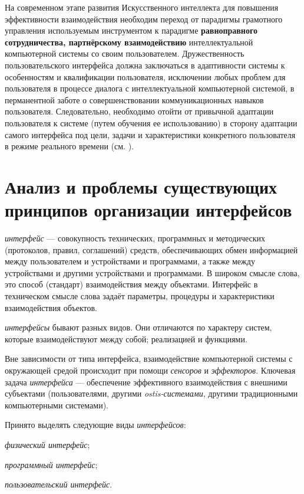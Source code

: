 На современном этапе развития Искусственного интеллекта для повышения эффективности взаимодействия необходим переход от парадигмы грамотного управления используемым инструментом к парадигме \textbf{равноправного сотрудничества, партнёрскому взаимодействию} интеллектуальной компьютерной системы со своим пользователем. Дружественность пользовательского интерфейса должна заключаться в адаптивности системы к особенностям и квалификации пользователя, исключении любых проблем для пользователя в процессе диалога с интеллектуальной компьютерной системой, в перманентной заботе о совершенствовании коммуникационных навыков пользователя. Следовательно, необходимо отойти от привычной адаптации пользователя к системе (путем обучения ее использованию) в сторону адаптации самого интерфейса под цели, задачи и характеристики конкретного пользователя в режиме реального времени (см. ).

\section{Анализ и проблемы существующих принципов организации интерфейсов}
\label{sec_analysis}

\textit{интерфейс} --- совокупность технических, программных и методических (протоколов, правил, соглашений) средств, обеспечивающих обмен информацией между пользователем и устройствами и программами, а также между устройствами и другими устройствами и программами. В широком смысле слова, это способ (стандарт) взаимодействия между объектами. Интерфейс в техническом смысле слова задаёт параметры, процедуры и характеристики взаимодействия объектов.

\textit{интерфейсы} бывают разных видов. Они отличаются по характеру систем, которые взаимодействуют между собой; реализацией и функциями.

Вне зависимости от типа интерфейса, взаимодействие компьютерной системы с окружающей средой происходит при помощи \textit{сенсоров} и \textit{эффекторов}.
Ключевая задача \textit{интерфейса} --- обеспечение эффективного взаимодействия с внешними субъектами (пользователями, другими \textit{ostis-системами}, другими традиционными компьютерными системами).

Принято выделять следующие виды \textit{интерфейсов}:
\begin{textitemize}
	\item \textit{физический интерфейс};
	\item \textit{программный интерфейс};
	\item \textit{пользовательский интерфейс}.
\end{textitemize}

